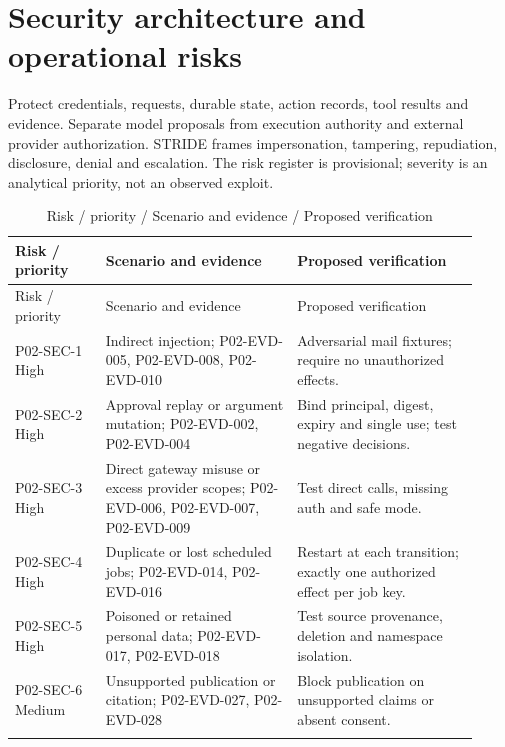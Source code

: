 \documentclass[10pt,letterpaper]{article}
\begin{document}
\section{Security architecture and operational risks}
Protect credentials, requests, durable state, action records, tool results and evidence. Separate model proposals from execution authority and external provider authorization. STRIDE frames impersonation, tampering, repudiation, disclosure, denial and escalation. The risk register is provisional; severity is an analytical priority, not an observed exploit.
\begin{longtable}{@{}>{\raggedright\arraybackslash}p{0.18\linewidth}>{\raggedright\arraybackslash}p{0.38\linewidth}>{\raggedright\arraybackslash}p{0.36\linewidth}@{}}
\caption{Risk / priority / Scenario and evidence / Proposed verification}\\
\toprule Risk / priority & Scenario and evidence & Proposed verification\\\midrule\endfirsthead
\toprule Risk / priority & Scenario and evidence & Proposed verification\\\midrule\endhead
P02-SEC-1 High & Indirect injection; P02-EVD-005, P02-EVD-008, P02-EVD-010 & Adversarial mail fixtures; require no unauthorized effects.\\\addlinespace
P02-SEC-2 High & Approval replay or argument mutation; P02-EVD-002, P02-EVD-004 & Bind principal, digest, expiry and single use; test negative decisions.\\\addlinespace
P02-SEC-3 High & Direct gateway misuse or excess provider scopes; P02-EVD-006, P02-EVD-007, P02-EVD-009 & Test direct calls, missing auth and safe mode.\\\addlinespace
P02-SEC-4 High & Duplicate or lost scheduled jobs; P02-EVD-014, P02-EVD-016 & Restart at each transition; exactly one authorized effect per job key.\\\addlinespace
P02-SEC-5 High & Poisoned or retained personal data; P02-EVD-017, P02-EVD-018 & Test source provenance, deletion and namespace isolation.\\\addlinespace
P02-SEC-6 Medium & Unsupported publication or citation; P02-EVD-027, P02-EVD-028 & Block publication on unsupported claims or absent consent.\\\addlinespace
\bottomrule\end{longtable}
\end{document}
